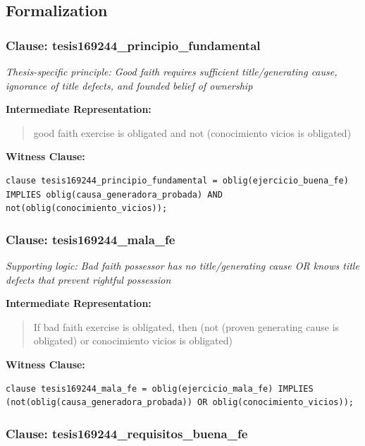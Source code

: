 \documentclass[11pt,a4paper]{article}
\begin{document}
\subsection{Formalization}

\subsubsection{Clause: tesis169244\_principio\_fundamental}

\textit{Thesis-specific principle: Good faith requires sufficient title/generating cause, ignorance of title defects, and founded belief of ownership}

\textbf{Intermediate Representation:}

\begin{quote}
good faith exercise is obligated and not (conocimiento vicios is obligated)
\end{quote}

\textbf{Witness Clause:}

\begin{lstlisting}[style=witnessstyle, language=Witness]
clause tesis169244_principio_fundamental = oblig(ejercicio_buena_fe) IMPLIES oblig(causa_generadora_probada) AND not(oblig(conocimiento_vicios));
\end{lstlisting}

\subsubsection{Clause: tesis169244\_mala\_fe}

\textit{Supporting logic: Bad faith possessor has no title/generating cause OR knows title defects that prevent rightful possession}

\textbf{Intermediate Representation:}

\begin{quote}
If bad faith exercise is obligated, then (not (proven generating cause is obligated) or conocimiento vicios is obligated)
\end{quote}

\textbf{Witness Clause:}

\begin{lstlisting}[style=witnessstyle, language=Witness]
clause tesis169244_mala_fe = oblig(ejercicio_mala_fe) IMPLIES (not(oblig(causa_generadora_probada)) OR oblig(conocimiento_vicios));
\end{lstlisting}

\subsubsection{Clause: tesis169244\_requisitos\_buena\_fe}
\end{document}
